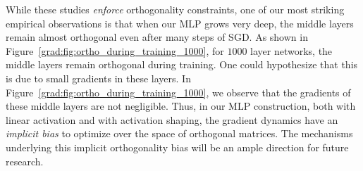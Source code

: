 While these studies \emph{enforce} orthogonality constraints, one of our most striking empirical observations is that when our MLP grows very deep, the middle layers remain almost orthogonal even after many steps of SGD. As shown in Figure~\ref{grad:fig:ortho_during_training_1000}, for $1000$ layer networks, the middle layers remain orthogonal during training. One could hypothesize that this is due to small gradients in these layers. In Figure~\ref{grad:fig:ortho_during_training_1000}, we observe that the gradients of these middle layers are not negligible. Thus, in our MLP construction, both with linear activation and with activation shaping, the gradient dynamics have an \emph{implicit bias} to optimize over the space of orthogonal matrices. The mechanisms underlying this implicit orthogonality bias will be an ample direction for future research.



